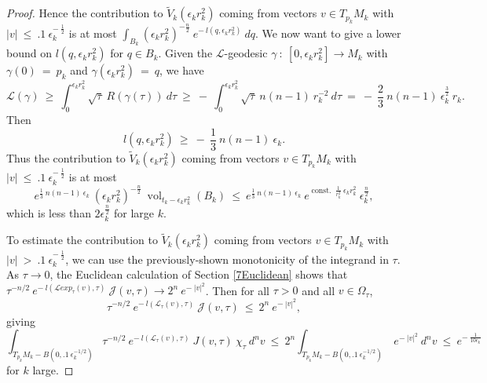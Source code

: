 \documentclass[12pt]{amsart}
\newcommand{\const}{\operatorname{const.}}
\newcommand{\vol}{\operatorname{vol}}
\numberwithin{equation}{section}
\theoremstyle{plain}
\theoremstyle{definition}
\theoremstyle{remark}
\begin{document}
\begin{proof}
Hence the contribution to $\tilde{V}_k(\epsilon_k r_k^2)$ coming from vectors
$v \in T_{p_k} M_k$ 
with $|v| \: \le \: .1 \: \epsilon_k^{- \: \frac12}$ is at most
$\int_{B_k} (\epsilon_k r_k^2)^{- \frac{n}{2}} \:
e^{- \: l(q, \epsilon_k r_k^2)} \: dq$. 
We now want to give a lower
bound on $l(q, \epsilon_k r_k^2)$ for $q \in B_k$. Given the
${\mathcal L}$-geodesic $\gamma \: : \: [0, \epsilon_k r_k^2] \rightarrow M_k$
with $\gamma(0) \: = \: p_k$ and $\gamma(\epsilon_k r_k^2) \: = \: q$,
we have
\begin{equation}
{\mathcal L}(\gamma) \: \ge \: \int_0^{\epsilon_k r_k^2} \sqrt{\tau} \:
R(\gamma(\tau)) \: d\tau \: \ge \: - \: 
\int_0^{\epsilon_k r_k^2} \sqrt{\tau} \:
n(n-1) \: r_k^{-2} \: d\tau \: = \: - \: \frac23 \: n(n-1) \: 
\epsilon_k^{\frac32} \: r_k. 
\end{equation}
Then
\begin{equation}
l(q, \epsilon_k r_k^2) \: \ge \: - \: \frac13 \: n(n-1) \: \epsilon_k.
\end{equation}
Thus the contribution to $\tilde{V}_k(\epsilon_k r_k^2)$ coming from vectors
$v \in T_{p_k}M_k$ 
with $|v| \: \le \: .1 \: \epsilon_k^{- \: \frac12}$ is at most
\begin{equation}
e^{\frac13 \: n(n-1) \: \epsilon_k} \: 
(\epsilon_k r_k^2)^{- \frac{n}{2}} \: \vol_{t_k - 
\epsilon_k r_k^2}(B_k) \: \le \:
e^{\frac13 \: n(n-1) \: \epsilon_k} \: 
e^{\const \: \frac{1}{r_k^2} \: \epsilon_k r_k^2} \:
\epsilon_k^{\frac{n}{2}},
\end{equation}
which is less than $2 \epsilon_k^{\frac{n}{2}}$ for large $k$.

To estimate
the contribution to $\tilde{V}_k(\epsilon_k r_k^2)$ coming from vectors
$v \in T_{p_k}M_k$ with $|v| \: > \: .1 \: \epsilon_k^{- \: \frac12}$, we
can use the previously-shown monotonicity of the integrand in $\tau$.
As $\tau \rightarrow 0$, the Euclidean calculation of Section \ref{7Euclidean}
shows that 
$\tau^{- n/2} \: e^{- \: 
l({\mathcal L} exp_\tau(v), \tau)} \:
{\mathcal J}(v, \tau) \rightarrow 2^n \: e^{- \: |v|^2}$.
Then for all $\tau > 0$ and all $v \in \Omega_\tau$,
\begin{equation}
\tau^{- n/2} \: e^{- \: 
l({\mathcal L}_\tau(v), \tau)} \:
{\mathcal J}(v, \tau) \: \le \: 2^n \: e^{- \: |v|^2},
\end{equation}
giving
\begin{equation}
\int_{T_{p_k}M_k - B(0, .1 \: \epsilon_k^{-1/2})}
\tau^{- n/2} \: e^{- \: l({\mathcal L}_\tau(v), \tau)} \:
J(v, \tau) \: \chi_\tau \: d^nv \: \le \:
2^n \int_{T_{p_k}M_k - B(0, .1 \: \epsilon_k^{-1/2})}
\: e^{- \: |v|^2} \: d^nv \: \le \:
 e^{- \:  \frac{1}{10 \epsilon_k}}
\end{equation}
for $k$ large.


\end{proof}
\end{document}
